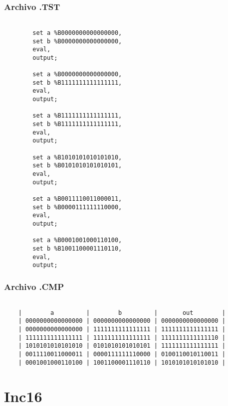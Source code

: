 \documentclass[12pt]{article}
\begin{document}
        \subsubsection{Archivo .TST}
        \begin{lstlisting}
            
        set a %B0000000000000000,
        set b %B0000000000000000,
        eval,
        output;
        
        set a %B0000000000000000,
        set b %B1111111111111111,
        eval,
        output;
        
        set a %B1111111111111111,
        set b %B1111111111111111,
        eval,
        output;
        
        set a %B1010101010101010,
        set b %B0101010101010101,
        eval,
        output;
        
        set a %B0011110011000011,
        set b %B0000111111110000,
        eval,
        output;
        
        set a %B0001001000110100,
        set b %B1001100001110110,
        eval,
        output;

        \end{lstlisting}
    

        \subsubsection{Archivo .CMP}
        \begin{lstlisting}
            
    |        a         |        b         |       out        |
    | 0000000000000000 | 0000000000000000 | 0000000000000000 |
    | 0000000000000000 | 1111111111111111 | 1111111111111111 |
    | 1111111111111111 | 1111111111111111 | 1111111111111110 |
    | 1010101010101010 | 0101010101010101 | 1111111111111111 |
    | 0011110011000011 | 0000111111110000 | 0100110010110011 |
    | 0001001000110100 | 1001100001110110 | 1010101010101010 |
        \end{lstlisting}
\newpage
\section{Inc16}
\end{document}
